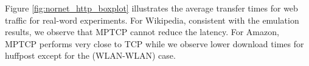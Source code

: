 
%



Figure \ref{fig:nornet_http_boxplot} illustrates the average transfer times for web traffic for real-word experiments. For Wikipedia, consistent with the emulation results, we observe that MPTCP cannot reduce the latency. For Amazon, MPTCP performs very close to TCP while we observe lower download times for huffpost except for the (WLAN-WLAN) case.



